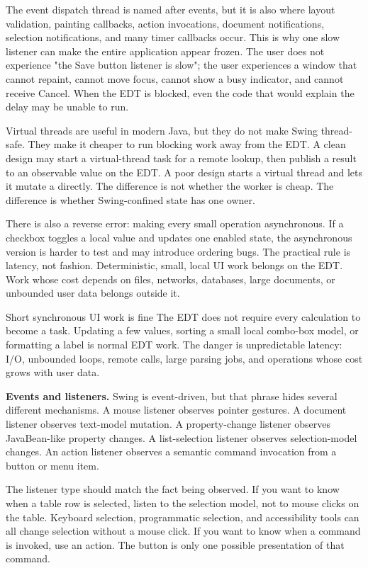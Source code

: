 The event dispatch thread is named after events, but it is also where layout validation, painting callbacks, action invocations, document notifications, selection notifications, and many timer callbacks occur. This is why one slow listener can make the entire application appear frozen. The user does not experience "the Save button listener is slow"; the user experiences a window that cannot repaint, cannot move focus, cannot show a busy indicator, and cannot receive Cancel. When the EDT is blocked, even the code that would explain the delay may be unable to run.

Virtual threads are useful in modern Java, but they do not make Swing thread-safe. They make it cheaper to run blocking work away from the EDT. A clean design may start a virtual-thread task for a remote lookup, then publish a result to an observable value on the EDT. A poor design starts a virtual thread and lets it mutate a  directly. The difference is not whether the worker is cheap. The difference is whether Swing-confined state has one owner.

There is also a reverse error: making every small operation asynchronous. If a checkbox toggles a local value and updates one enabled state, the asynchronous version is harder to test and may introduce ordering bugs. The practical rule is latency, not fashion. Deterministic, small, local UI work belongs on the EDT. Work whose cost depends on files, networks, databases, large documents, or unbounded user data belongs outside it.

\begin{principlebox}{Short synchronous UI work is fine}
The EDT does not require every calculation to become a task. Updating a few values, sorting a small local combo-box model, or formatting a label is normal EDT work. The danger is unpredictable latency: I/O, unbounded loops, remote calls, large parsing jobs, and operations whose cost grows with user data.
\end{principlebox}

\textbf{Events and listeners.} Swing is event-driven, but that phrase hides several different mechanisms. A mouse listener observes pointer gestures. A document listener observes text-model mutation. A property-change listener observes JavaBean-like property changes. A list-selection listener observes selection-model changes. An action listener observes a semantic command invocation from a button or menu item.

The listener type should match the fact being observed. If you want to know when a table row is selected, listen to the selection model, not to mouse clicks on the table. Keyboard selection, programmatic selection, and accessibility tools can all change selection without a mouse click. If you want to know when a command is invoked, use an action. The button is only one possible presentation of that command.

